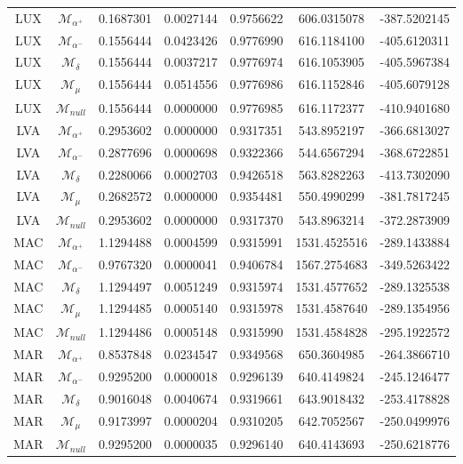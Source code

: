 \begin{tabular}{ccccccc}
LUX & $\mathcal{M}_{\alpha^+}$ & 0.1687301 & 0.0027144 & 0.9756622 & 606.0315078 & -387.5202145\\
LUX & $\mathcal{M}_{\alpha^-}$ & 0.1556444 & 0.0423426 & 0.9776990 & 616.1184100 & -405.6120311\\
LUX & $\mathcal{M}_{\delta}$ & 0.1556444 & 0.0037217 & 0.9776974 & 616.1053905 & -405.5967384\\
LUX & $\mathcal{M}_{\mu}$ & 0.1556444 & 0.0514556 & 0.9776986 & 616.1152846 & -405.6079128\\
LUX & $\mathcal{M}_{null}$ & 0.1556444 & 0.0000000 & 0.9776985 & 616.1172377 & -410.9401680\\
LVA & $\mathcal{M}_{\alpha^+}$ & 0.2953602 & 0.0000000 & 0.9317351 & 543.8952197 & -366.6813027\\
LVA & $\mathcal{M}_{\alpha^-}$ & 0.2877696 & 0.0000698 & 0.9322366 & 544.6567294 & -368.6722851\\
LVA & $\mathcal{M}_{\delta}$ & 0.2280066 & 0.0002703 & 0.9426518 & 563.8282263 & -413.7302090\\
LVA & $\mathcal{M}_{\mu}$ & 0.2682572 & 0.0000000 & 0.9354481 & 550.4990299 & -381.7817245\\
LVA & $\mathcal{M}_{null}$ & 0.2953602 & 0.0000000 & 0.9317370 & 543.8963214 & -372.2873909\\
MAC & $\mathcal{M}_{\alpha^+}$ & 1.1294488 & 0.0004599 & 0.9315991 & 1531.4525516 & -289.1433884\\
MAC & $\mathcal{M}_{\alpha^-}$ & 0.9767320 & 0.0000041 & 0.9406784 & 1567.2754683 & -349.5263422\\
MAC & $\mathcal{M}_{\delta}$ & 1.1294497 & 0.0051249 & 0.9315974 & 1531.4577652 & -289.1325538\\
MAC & $\mathcal{M}_{\mu}$ & 1.1294485 & 0.0005140 & 0.9315978 & 1531.4587640 & -289.1354956\\
MAC & $\mathcal{M}_{null}$ & 1.1294486 & 0.0005148 & 0.9315990 & 1531.4584828 & -295.1922572\\
MAR & $\mathcal{M}_{\alpha^+}$ & 0.8537848 & 0.0234547 & 0.9349568 & 650.3604985 & -264.3866710\\
MAR & $\mathcal{M}_{\alpha^-}$ & 0.9295200 & 0.0000018 & 0.9296139 & 640.4149824 & -245.1246477\\
MAR & $\mathcal{M}_{\delta}$ & 0.9016048 & 0.0040674 & 0.9319661 & 643.9018432 & -253.4178828\\
MAR & $\mathcal{M}_{\mu}$ & 0.9173997 & 0.0000204 & 0.9310205 & 642.7052567 & -250.0499976\\
MAR & $\mathcal{M}_{null}$ & 0.9295200 & 0.0000035 & 0.9296140 & 640.4143693 & -250.6218776\\

\end{tabular}

